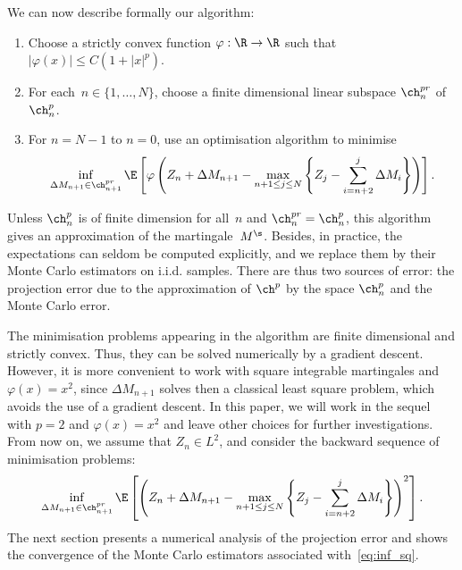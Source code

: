 \noindent We can now describe formally our algorithm:
\begin{enumerate}
  \item Choose a strictly convex function $\varphi:\R \to \R$  such that $|\varphi(x)|\le C(1+|x|^p)$.
  \item For each~$n\in \{1,\dots,N\}$, choose a finite dimensional linear subspace $\ch^{pr}_n$ of $\ch^p_n$.
  \item For $n=N-1$ to $n=0$, use an optimisation algorithm to  minimise 
  $$ \inf_{\Delta M_{n+1} \in \ch^{pr}_{n+1}}\E\left[ \varphi\left(Z_{n} + \Delta M_{n+1}  - \max_{n + 1\le j \le N} \left\{Z_{j} - \sum_{i=n+2}^{j} \Delta M_i\right\}\right)\right].$$
\end{enumerate} 
Unless $\ch^p_n$ is of finite dimension for all~$n$ and $\ch^{pr}_n=\ch^p_n$, this algorithm gives an approximation of the martingale~$M^\s$. Besides, in practice, the expectations can seldom be computed explicitly, and we replace them by their Monte Carlo estimators on i.i.d. samples. There are thus two sources of error: the projection error due to the approximation of $\ch^p$ by the space $\ch^p_n$ and the Monte Carlo error.   

The minimisation problems appearing in the algorithm are finite dimensional and strictly convex. Thus, they can be solved numerically by a gradient descent. However, it is more convenient to work with square integrable martingales and $\varphi(x)=x^2$, since $\Delta M_{n+1}$ solves then a classical least square problem, which avoids the use of a gradient descent. In this paper, we will work in the sequel with $p=2$ and $\varphi(x)=x^2$ and leave other choices for further investigations. From now on, we assume that $Z_n \in L^2$, and consider the backward sequence of minimisation problems:
\begin{equation}\label{eq:inf_sq} \inf_{\Delta M_{n+1} \in \ch^{pr}_{n+1}}\E\left[ \left(Z_{n} + \Delta M_{n+1}  - \max_{n + 1\le j \le N} \left\{Z_{j} - \sum_{i=n+2}^{j} \Delta M_i\right\}\right)^2\right].
\end{equation}
The next section presents a numerical analysis of the projection error and shows the convergence of the Monte Carlo estimators associated with~\eqref{eq:inf_sq}.

